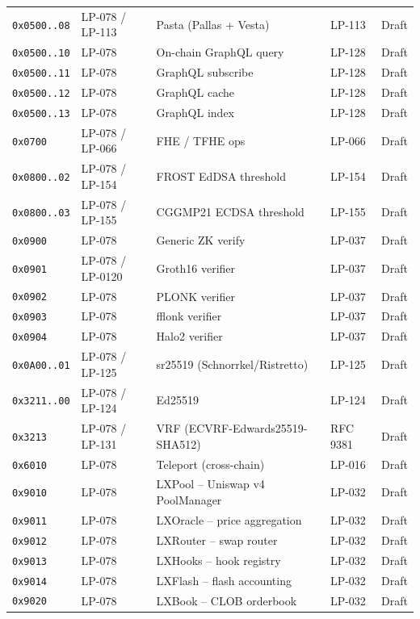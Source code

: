 \begin{longtable}{@{}p{2.0cm}p{2.4cm}p{4.2cm}p{3.0cm}p{1.2cm}@{}}
\texttt{0x0500..08} & LP-078 / LP-113 & Pasta (Pallas + Vesta) & LP-113 & Draft \\
\texttt{0x0500..10} & LP-078 & On-chain GraphQL query & LP-128 & Draft \\
\texttt{0x0500..11} & LP-078 & GraphQL subscribe & LP-128 & Draft \\
\texttt{0x0500..12} & LP-078 & GraphQL cache & LP-128 & Draft \\
\texttt{0x0500..13} & LP-078 & GraphQL index & LP-128 & Draft \\
\texttt{0x0700} & LP-078 / LP-066 & FHE / TFHE ops & LP-066 & Draft \\
\texttt{0x0800..02} & LP-078 / LP-154 & FROST EdDSA threshold & LP-154 & Draft \\
\texttt{0x0800..03} & LP-078 / LP-155 & CGGMP21 ECDSA threshold & LP-155 & Draft \\
\texttt{0x0900} & LP-078 & Generic ZK verify & LP-037 & Draft \\
\texttt{0x0901} & LP-078 / LP-0120 & Groth16 verifier & LP-037 & Draft \\
\texttt{0x0902} & LP-078 & PLONK verifier & LP-037 & Draft \\
\texttt{0x0903} & LP-078 & fflonk verifier & LP-037 & Draft \\
\texttt{0x0904} & LP-078 & Halo2 verifier & LP-037 & Draft \\
\texttt{0x0A00..01} & LP-078 / LP-125 & sr25519 (Schnorrkel/Ristretto) & LP-125 & Draft \\
\texttt{0x3211..00} & LP-078 / LP-124 & Ed25519 & LP-124 & Draft \\
\texttt{0x3213} & LP-078 / LP-131 & VRF (ECVRF-Edwards25519-SHA512) & RFC 9381 & Draft \\
\texttt{0x6010} & LP-078 & Teleport (cross-chain) & LP-016 & Draft \\
\texttt{0x9010} & LP-078 & LXPool -- Uniswap v4 PoolManager & LP-032 & Draft \\
\texttt{0x9011} & LP-078 & LXOracle -- price aggregation & LP-032 & Draft \\
\texttt{0x9012} & LP-078 & LXRouter -- swap router & LP-032 & Draft \\
\texttt{0x9013} & LP-078 & LXHooks -- hook registry & LP-032 & Draft \\
\texttt{0x9014} & LP-078 & LXFlash -- flash accounting & LP-032 & Draft \\
\texttt{0x9020} & LP-078 & LXBook -- CLOB orderbook & LP-032 & Draft \\

\end{longtable}
